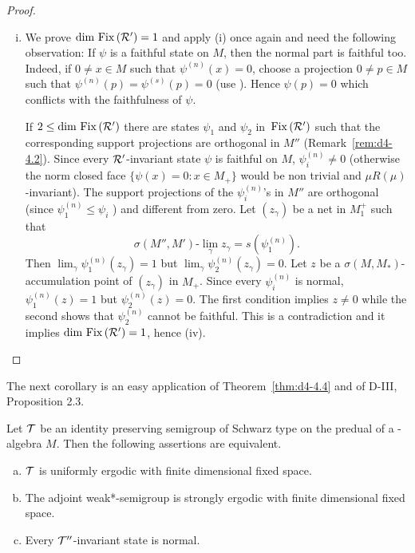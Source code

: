 \begin{proof}
\begin{enumerate}[(i), wide]
\item
We prove $ \dim \mathop{}\mathrm{Fix}\left(\mathcal{R}'\right) = 1 $  and apply (i) once again and need the following observation: If $ \psi $  is a faithful state on $ M $,  then the normal part is faithful too.
Indeed, if $ 0 \neq x \in M $  such that $ \psi^{(n)}(x) = 0 $,  choose a projection $ 0 \neq p \in M $  such that $ \psi^{(n)}(p) = \psi^{(s)}(p) = 0 $ (use \citet[Theorem III.3.8]{takesaki:1979}). 
Hence $ \psi(p) = 0 $  which conflicts with the faithfulness of $ \psi $.

If $ 2 \leq \dim \mathop{}\mathrm{Fix}\left(\mathcal{R}'\right) $  there are states $ \psi_{1} $  and $ \psi_{2} $  in $ \mathop{}\mathrm{Fix}\left(\mathcal{R}'\right) $  such that the corresponding support projections are orthogonal in $ M'' $  (Remark~\ref{rem:d4-4.2}).
Since every $ \mathcal{R}' $-invariant state $ \psi $  is faithful on $ M $, $ \psi_{i}^{(n)} \neq 0 $  (otherwise the norm closed face $ \{\psi(x) = 0: x \in M_{+}\} $  would
be non trivial and $ \mu R(\mu) $-invariant).
The support projections of the $ \psi_{i}^{(n)} $'s in $ M'' $  are orthogonal (since $ \psi_{1}^{(n)} \leq \psi_{i} $ ) and different from zero.
Let $ (z_{\gamma}) $  be a net in $ M_{1}^{+} $  such that
\[
	\sigma(M'',M')\text{-}\lim_{\gamma} z_{\gamma} = s(\psi_{1}^{(n)}).
\]
Then $ \lim_{\gamma} \psi_{1}^{(n)}(z_{\gamma}) = 1 $  but $ \lim_{\gamma} \psi_{2}^{(n)}(z_{\gamma}) = 0 $.
Let $ z $  be a $ \sigma(M,M_{*}) $-accumulation point of $ (z_{\gamma}) $  in $ M_{+} $.
Since every $ \psi_{i}^{(n)} $  is normal, $ \psi_{1}^{(n)}(z) = 1 $  but $ \psi_{2}^{(n)}(z) = 0 $.
The first condition implies $ z \neq 0 $  while the second shows that $ \psi_{2}^{(n)} $  cannot be faithful.
This is a contradiction and it implies $ \dim \mathop{}\mathrm{Fix}\left(\mathcal{R}'\right) = 1 $, hence (iv).
\end{enumerate}
\end{proof}
The next corollary is an easy application of\/ Theorem~\ref{thm:d4-4.4} and of D-III, Proposition 2.3.
\begin{corollary}\label{cor:d4-4.5}
Let $ \mathcal{T} $  be an identity preserving semigroup of Schwarz type on the predual of a \WA-algebra $ M $.
Then the following assertions are equivalent.
\begin{enumerate}[(a)]
\item
$ \mathcal{T} $  is uniformly ergodic with finite dimensional fixed space.

\item
The adjoint weak*-semigroup is strongly ergodic with finite dimensional fixed space.

\item
Every $ \mathcal{T}'' $-invariant state is normal.
\end{enumerate}
\end{corollary}
